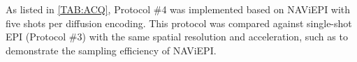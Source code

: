\documentclass[preprint,12pt,authoryear,review]{elsarticle}
\begin{document}
    As listed in \cref{TAB:ACQ},
    Protocol \#4 was implemented based on
    NAViEPI with five shots per diffusion encoding.
    This protocol was compared against single-shot EPI (Protocol \#3)
    with the same spatial resolution and acceleration,
    such as to demonstrate the sampling efficiency of NAViEPI.

\end{document}
